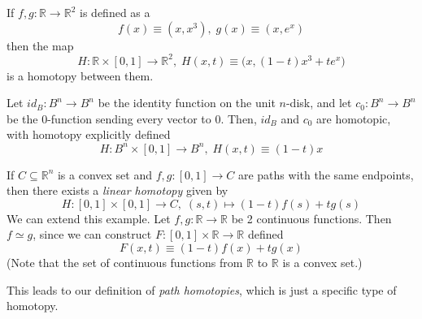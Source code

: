   \begin{example}
  If $f, g: \mathbb{R} \longrightarrow \mathbb{R}^2$ is defined as a
  \[f(x) \equiv (x, x^3), \; g(x) \equiv (x, e^x)\]
  then the map 
  \[H: \mathbb{R} \times [0,1] \longrightarrow \mathbb{R}^2, \; H(x, t) \equiv \big( x, (1-t) x^3 + t e^x \big) \]
  is a homotopy between them. 
  \end{example}

  \begin{example}
  Let $id_B: B^n \longrightarrow B^n$ be the identity function on the unit $n$-disk, and let $c_0: B^n \longrightarrow B^n$ be the $0$-function sending every vector to $0$. Then, $id_B$ and $c_0$ are homotopic, with homotopy explicitly defined
  \[H: B^n \times [0,1] \longrightarrow B^n, \; H(x, t) \equiv (1-t) x\]
  \end{example}

  \begin{example}
  If $C \subseteq \mathbb{R}^n$ is a convex set and $f, g: [0,1] \longrightarrow C$ are paths with the same endpoints, then there exists a \textit{linear homotopy} given by 
  \[H: [0,1] \times [0,1] \longrightarrow C, \; (s, t) \mapsto (1-t) f(s) + t g(s)\]
  We can extend this example. Let $f, g: \mathbb{R} \longrightarrow \mathbb{R}$ be 2 continuous functions. Then $f \simeq g$, since we can construct $F: [0,1] \times \mathbb{R} \longrightarrow \mathbb{R}$ defined
  \[F(x, t) \equiv (1-t) f(x) + t g(x)\]
  (Note that the set of continuous functions from $\mathbb{R}$ to $\mathbb{R}$ is a convex set.)
  \end{example}
  This leads to our definition of \textit{path homotopies}, which is just a specific type of homotopy. 

